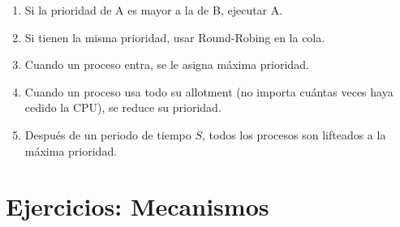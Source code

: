\documentclass[12pt]{article}
\theoremstyle{definition}
\begin{document}
\begin{enumerate}
    \item Si la prioridad de A es mayor a la de B, ejecutar A. 
    \item Si tienen la misma prioridad, usar Round-Robing en la cola. 
    \item Cuando un proceso entra, se le asigna máxima prioridad. 
    \item Cuando un proceso usa todo su allotment (no importa cuántas veces haya
        cedido la CPU), se reduce su prioridad. 
    \item Después de un periodo de tiempo $S$, todos los procesos son lifteados
        a la máxima prioridad.
\end{enumerate}









































\pagebreak
\section{Ejercicios: Mecanismos}
\end{document}
